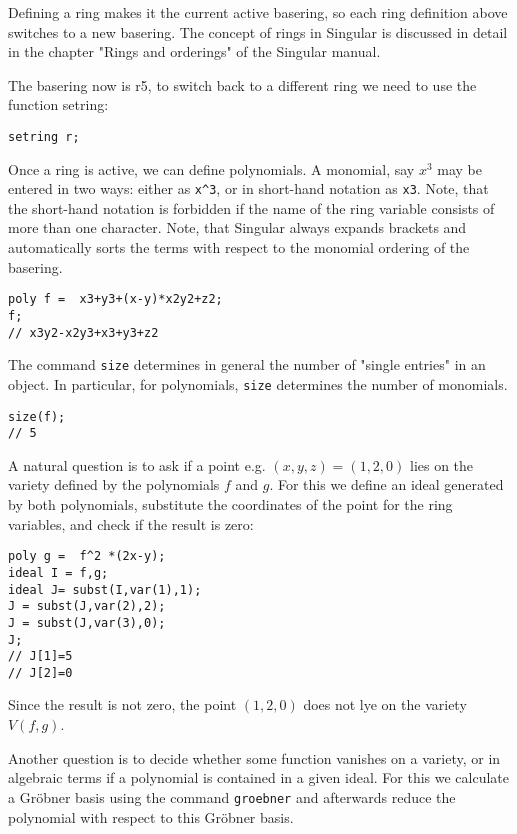 \documentclass[12pt]{amsart}
\begin{document}
Defining a ring makes it the current active basering, so each ring definition above switches to a new basering. 
The concept of rings in Singular is discussed in detail in the chapter "Rings and orderings" of the Singular manual.

The basering now is r5, to switch back to a different ring we need to use  
the function setring:

\begin{verbatim}
setring r;
\end{verbatim}

Once a ring is active, we can define polynomials. A monomial, say $x^3$ may be entered in two ways: 
either as \verb+x^3+, or in short-hand notation as \verb+x3+. Note, that the short-hand notation is forbidden if 
the name of the ring variable consists of more than one character. 
Note, that Singular always expands brackets and automatically sorts the terms with respect to the monomial ordering of the basering.

\begin{verbatim}
poly f =  x3+y3+(x-y)*x2y2+z2;
f;
// x3y2-x2y3+x3+y3+z2
\end{verbatim}

The command \texttt{size} determines in general the number of "single entries" in an object. 
In particular, for polynomials, \texttt{size} determines the number of monomials.

\begin{verbatim}
size(f);
// 5
\end{verbatim}

A natural question is to ask if a point e.g. $(x,y,z)=(1,2,0)$ lies on the variety defined by the polynomials $f$ and $g$. 
For this we define an ideal generated by both polynomials, substitute the coordinates of the point for the ring variables, 
and check if the result is zero:

\begin{verbatim}
poly g =  f^2 *(2x-y);
ideal I = f,g;
ideal J= subst(I,var(1),1);
J = subst(J,var(2),2);
J = subst(J,var(3),0);
J;
// J[1]=5
// J[2]=0
\end{verbatim}

Since the result is not zero, the point $(1,2,0)$ does not lye on the variety $V(f,g)$.

Another question is to decide whether some function vanishes on a variety, 
or in algebraic terms if a polynomial is contained in a given ideal. For this we calculate 
a Gr\"obner basis using the command \texttt{groebner} and afterwards reduce the polynomial 
with respect to this Gr\"obner basis.
\end{document}
